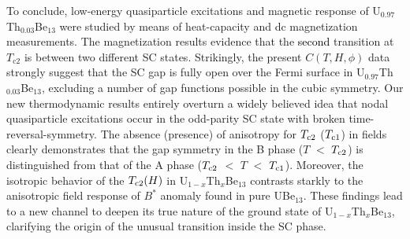 \documentclass[twocolumn, prl]{revtex4}%
\newcommand{\correct}[1]{\textcolor{black}{#1}}
\begin{document}
\color{black}

To conclude, 
  low-energy quasiparticle excitations and magnetic response  of U$_{0.97}$Th$_{0.03}$Be$_{13}$  were studied by means of   heat-capacity and dc magnetization measurements.
The  magnetization results  evidence  that the \correct{second} transition at   $T_{\mathrm{c2}}$
 is between two different 
 SC 
 states.
Strikingly, the present $C(T,H,\phi)$ data
 strongly suggest
   that the SC gap is fully open over the Fermi surface in U$_{0.97}$Th$_{0.03}$Be$_{13}$,
 excluding a number of   gap functions possible in the cubic symmetry.
Our new thermodynamic results  
  entirely  overturn a widely believed idea that 
  nodal quasiparticle excitations occur in the odd-parity SC state with  broken time-reversal-symmetry.
The absence (presence) of anisotropy for $T_{\rm c2}$ ($T_{\rm c1}$)
    in  fields clearly demonstrates  that the gap symmetry in the B phase ($T$ $<$ $T_{\rm  c2}$)   is 
   distinguished  from that of the A phase ($T_{\rm c2}$ $<$ $T$ $<$ $T_{\rm c1}$).
 Moreover, the isotropic behavior of the $T_{\rm  c2}(H)$ in U$_{1-x}$Th$_{x}$Be$_{13}$ 
  contrasts starkly to  the anisotropic field response of  $B^{*}$ anomaly found in pure UBe$_{13}$.
These findings   lead  to a new channel  to  deepen  its true nature of  the  ground state
 of    U$_{1-x}$Th$_{x}$Be$_{13}$,  clarifying  the origin of the 
 unusual transition inside the SC phase.






\color{black}
\end{document}
